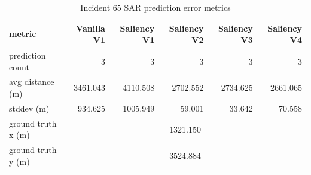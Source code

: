 \begin{table}[ht]
\centering
\caption{Incident 65 SAR prediction error metrics}
\label{tab:sar-incident-65}
\begin{tabular}{lrrrrr}
\hline
metric & Vanilla V1 & Saliency V1 & Saliency V2 & Saliency V3 & Saliency V4 \\
\hline
prediction count & 3 & 3 & 3 & 3 & 3 \\
avg distance (m) & 3461.043 & 4110.508 & 2702.552 & 2734.625 & 2661.065 \\
stddev (m) & 934.625 & 1005.949 & 59.001 & 33.642 & 70.558 \\
ground truth x (m) & \multicolumn{5}{c}{1321.150} \\
ground truth y (m) & \multicolumn{5}{c}{3524.884} \\
\hline
\end{tabular}
\end{table}
